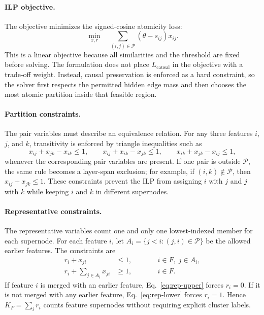 \documentclass[../main.tex]{subfiles}
\begin{document}
\paragraph{ILP objective.}
The objective minimizes the signed-cosine atomicity loss:
\begin{equation}
\min_{x,r}
\quad
\sum_{(i,j)\in\mathcal{P}}
(\theta - s_{ij})x_{ij}.
\label{eq:Lstage2}
\end{equation}
This is a linear objective because all similarities and the threshold are fixed
before solving. The formulation does not place $L_{\text{causal}}$ in the
objective with a trade-off weight. Instead, causal preservation is enforced as a
hard constraint, so the solver first respects the permitted hidden edge mass and
then chooses the most atomic partition inside that feasible region.

\paragraph{Partition constraints.}
The pair variables must describe an equivalence relation. For any three features
$i$, $j$, and $k$, transitivity is enforced by triangle inequalities such as
\begin{equation}
x_{ij} + x_{jk} - x_{ik} \le 1,
\qquad
x_{ij} + x_{ik} - x_{jk} \le 1,
\qquad
x_{ik} + x_{jk} - x_{ij} \le 1,
\label{eq:transitivity}
\end{equation}
whenever the corresponding pair variables are present. If one pair is outside
$\mathcal{P}$, the same rule becomes a layer-span exclusion; for example, if
$(i,k)\notin\mathcal{P}$, then $x_{ij}+x_{jk}\le 1$. These constraints prevent the
ILP from assigning $i$ with $j$ and $j$ with $k$ while keeping $i$ and $k$ in
different supernodes.

\paragraph{Representative constraints.}
The representative variables count one and only one lowest-indexed member for each
supernode. For each feature $i$, let
$A_i = \{j<i : (j,i)\in\mathcal{P}\}$ be the allowed earlier features. The
constraints are
\begin{align}
r_i + x_{ji} &\le 1,
\qquad &&i\in F,\; j\in A_i, \label{eq:rep-upper}\\
r_i + \sum_{j\in A_i} x_{ji} &\ge 1,
\qquad &&i\in F. \label{eq:rep-lower}
\end{align}
If feature $i$ is merged with an earlier feature, Eq.~\eqref{eq:rep-upper} forces
$r_i=0$. If it is not merged with any earlier feature, Eq.~\eqref{eq:rep-lower}
forces $r_i=1$. Hence $K_F=\sum_i r_i$ counts feature supernodes without requiring
explicit cluster labels.
\end{document}
